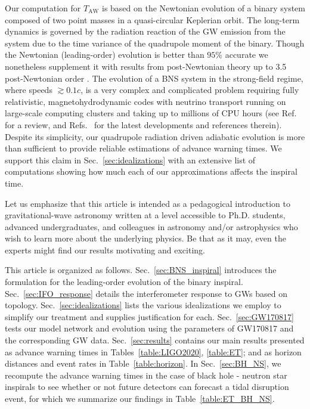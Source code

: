 \documentclass[prd,amsmath,amssymb,aps,floats,amsfonts,notitlepage,superscriptaddress,eqsecnum,nofootinbib,10pt]{revtex4-1}
\begin{document}
Our computation for $T_\text{AW}$ is based on the Newtonian evolution of a binary system composed of two point masses in a quasi-circular Keplerian orbit. 
The long-term dynamics is governed by the radiation reaction of 
the GW emission from the system due to the time variance of the quadrupole moment of the binary.
Though the Newtonian (leading-order) evolution is better than $ 95\%$ accurate
we nonetheless supplement it with results from post-Newtonian theory up to 3.5 post-Newtonian order \cite{Blanchet_LRR}.
The evolution of a BNS system in the strong-field regime, where speeds $\gtrsim 0.1c$, is a very complex and complicated problem requiring fully relativistic, magnetohydrodynamic codes 
with neutrino transport running on large-scale computing clusters and taking up to millions of CPU hours 
(see Ref.~\cite{Faber:2012rw} for a review, and Refs.~\cite{Kyutoku:2017voj, Zappa:2017xba, Dietrich:2018upm} for the latest developments and references therein).
Despite its simplicity, our quadrupole radiation driven adiabatic
evolution is more than sufficient to provide reliable estimations of advance warning times.
We support this claim in Sec.~\ref{sec:idealizations} with an extensive list of computations showing how much each of our approximations affects the inspiral time.

Let us emphasize that this article is intended as a pedagogical introduction to gravitational-wave astronomy written at a level accessible to
Ph.D. students, advanced undergraduates, and colleagues in astronomy and/or astrophysics who wish to learn more about the underlying physics.
Be that as it may, even the experts might find our results motivating and exciting.

This article is organized as follows. Sec.~\ref{sec:BNS_inspiral} introduces the formulation for the leading-order evolution of the binary inspiral.
Sec.~\ref{sec:IFO_response} details the interferometer response to GWs based on topology.
Sec.~\ref{sec:idealizations} lists the various idealizations we employ to simplify our treatment and supplies justification for each.
Sec.~\ref{sec:GW170817} tests our model network and evolution using the parameters of GW170817 and the corresponding GW data.
Sec.~\ref{sec:results} contains our main results presented as advance warning times in Tables~\ref{table:LIGO2020}, \ref{table:ET}; 
and as horizon distances and event rates in Table~\ref{table:horizon}.
In Sec.~\ref{sec:BH_NS}, we recompute the advance warning times in the case of black hole - neutron star inspirals to see whether or not 
future detectors can forecast a tidal disruption event, for which we summarize our findings in Table~\ref{table:ET_BH_NS}.
\end{document}

